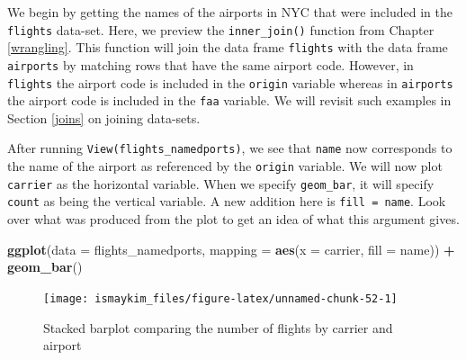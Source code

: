 \documentclass[12pt,]{krantz}
\makeatletter
\newenvironment{Shaded}{\begin{snugshade}}{\end{snugshade}}
\newcommand{\KeywordTok}[1]{\textcolor[rgb]{0.27,0.27,0.27}{\textbf{#1}}}
\newcommand{\DataTypeTok}[1]{\textcolor[rgb]{0.27,0.27,0.27}{#1}}
\newcommand{\StringTok}[1]{\textcolor[rgb]{0.5,0.5,0.5}{#1}}
\newcommand{\OperatorTok}[1]{\textcolor[rgb]{0.43,0.43,0.43}{\textbf{#1}}}
\newcommand{\NormalTok}[1]{#1}
\newenvironment{kframe}{%
\medskip{}
\setlength{\fboxsep}{.8em}
 \def\at@end@of@kframe{}%
 \ifinner\ifhmode%
  \def\at@end@of@kframe{\end{minipage}}%
  \begin{minipage}{\columnwidth}%
 \fi\fi%
 \def\FrameCommand##1{\hskip\@totalleftmargin \hskip-\fboxsep
 \colorbox{shadecolor}{##1}\hskip-\fboxsep
     \hskip-\linewidth \hskip-\@totalleftmargin \hskip\columnwidth}%
 \MakeFramed {\advance\hsize-\width
   \@totalleftmargin\z@ \linewidth\hsize
   \@setminipage}}%
 {\par\unskip\endMakeFramed%
 \at@end@of@kframe}
\renewenvironment{Shaded}{\begin{kframe}}{\end{kframe}}
\makeatother
\begin{document}
We begin by getting the names of the airports in NYC that were included
in the \texttt{flights} data-set. Here, we preview the
\texttt{inner\_join()} function from Chapter \ref{wrangling}. This
function will join the data frame \texttt{flights} with the data frame
\texttt{airports} by matching rows that have the same airport code.
However, in \texttt{flights} the airport code is included in the
\texttt{origin} variable whereas in \texttt{airports} the airport code
is included in the \texttt{faa} variable. We will revisit such examples
in Section \ref{joins} on joining data-sets.

\begin{Shaded}
\end{Shaded}

After running \texttt{View(flights\_namedports)}, we see that
\texttt{name} now corresponds to the name of the airport as referenced
by the \texttt{origin} variable. We will now plot \texttt{carrier} as
the horizontal variable. When we specify \texttt{geom\_bar}, it will
specify \texttt{count} as being the vertical variable. A new addition
here is \texttt{fill\ =\ name}. Look over what was produced from the
plot to get an idea of what this argument gives.

\begin{Shaded}
\begin{Highlighting}[]
\KeywordTok{ggplot}\NormalTok{(}\DataTypeTok{data =}\NormalTok{ flights_namedports, }
       \DataTypeTok{mapping =} \KeywordTok{aes}\NormalTok{(}\DataTypeTok{x =}\NormalTok{ carrier, }\DataTypeTok{fill =}\NormalTok{ name)) }\OperatorTok{+}
\StringTok{  }\KeywordTok{geom_bar}\NormalTok{()}
\end{Highlighting}
\end{Shaded}

\begin{figure}

{\centering \texttt{[image: ismaykim\_files/figure-latex/unnamed-chunk-52-1]} 

}

\caption{Stacked barplot comparing the number of flights by carrier and airport}\label{fig:unnamed-chunk-52}
\end{figure}
\end{document}
